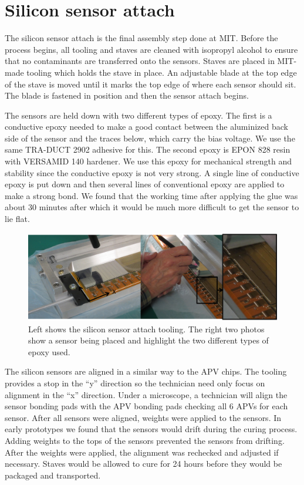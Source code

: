 \documentclass[preprint,12pt]{elsarticle}
\begin{document}
\section{Silicon sensor attach}
The silicon sensor attach is the final assembly step done at MIT. Before the
process begins, all tooling and staves are cleaned with isopropyl alcohol to
ensure that no contaminants are transferred onto the sensors. Staves are placed
in MIT-made tooling which holds the stave in place. An adjustable blade at the
top edge of the stave is moved until it marks the top edge of where each sensor
should sit. The blade is fastened in position and then the sensor attach
begins.

The sensors are held down with two different types of epoxy. The first is a
conductive epoxy needed to make a good contact between the aluminized back side
of the sensor and the traces below, which carry the bias voltage. We use the
same TRA-DUCT 2902 adhesive for this. The second epoxy is EPON 828 resin with
VERSAMID 140 hardener. We use this epoxy for mechanical strength and stability since the
conductive epoxy is not very strong. A single line of conductive epoxy is put
down and then several lines of conventional epoxy are applied to make a strong
bond. We found that the working time after applying the glue was about 30
minutes after which it would be much more difficult to get the sensor to lie
flat.

\begin{figure}[h]
\begin{center}
\includegraphics[width=6in, keepaspectratio=true, angle=0]{graphics/si_glue.jpg}
\caption{Left shows the silicon sensor attach tooling.  The right two photos show
a sensor being placed and highlight the two different types of epoxy used.
\label{fig:si_glue}}
\end{center}
\end{figure}

The silicon sensors are aligned in a similar way to the APV chips. The tooling
provides a stop in the ``y'' direction so the technician need only focus on
alignment in the ``x'' direction. Under a microscope, a technician will align the
sensor bonding pads with the APV bonding pads checking all 6 APVs for each
sensor. After all sensors were aligned, weights were applied to the sensors.
In early prototypes we found that the sensors would drift during the curing
process. Adding weights to the tops of the sensors prevented the sensors from
drifting. After the weights were applied, the alignment was rechecked and
adjusted if necessary. Staves would be allowed to cure for 24 hours before
they would be packaged and transported.
\end{document}
